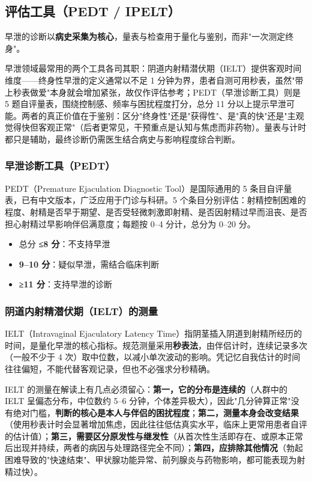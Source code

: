 \documentclass[12pt,a4paper,twoside]{ctexbook}
\begin{document}
\subsection{评估工具（PEDT / IPELT）}

早泄的诊断以\textbf{病史采集为核心}，量表与检查用于量化与鉴别，而非"一次测定终身"。


早泄领域最常用的两个工具各司其职：阴道内射精潜伏期（IELT）提供客观时间维度——终身性早泄的定义通常以不足 1 分钟为界，患者自测可用秒表，虽然"带上秒表做爱"本身就会增加紧张，故仅作评估参考；PEDT（早泄诊断工具）则是 5 题自评量表，围绕控制感、频率与困扰程度打分，总分 11 分以上提示早泄可能。两者的真正价值在于鉴别：区分"终身性"还是"获得性"、是"真的快"还是"主观觉得快但客观正常"（后者更常见，干预重点是认知与焦虑而非药物）。量表与计时都只是辅助，最终诊断仍需医生结合病史与影响程度综合判断。

\subsubsection{早泄诊断工具（PEDT）}

PEDT（Premature Ejaculation Diagnostic Tool）是国际通用的 5 条目自评量表，已有中文版本，广泛应用于门诊与科研。5 个条目分别评估：射精控制困难的程度、射精是否早于期望、是否受轻微刺激即射精、是否因射精过早而沮丧、是否担心射精过早影响伴侣满意度；每题按 0--4 分计，总分为 0--20 分。

\begin{itemize}
	\item 总分 \textbf{≤8 分}：不支持早泄
	\item \textbf{9--10 分}：疑似早泄，需结合临床判断
	\item \textbf{≥11 分}：支持早泄的诊断
\end{itemize}

\subsubsection{阴道内射精潜伏期（IELT）的测量}

IELT（Intravaginal Ejaculatory Latency Time）指阴茎插入阴道到射精所经历的时间，是量化早泄的核心指标。规范测量采用\textbf{秒表法}，由伴侣计时，连续记录多次（一般不少于 4 次）取中位数，以减小单次波动的影响。凭记忆自我估计的时间往往偏短，不能代替客观记录，但也不必强求分秒精确。


IELT 的测量在解读上有几点必须留心：\textbf{第一，它的分布是连续的}（人群中的 IELT 呈偏态分布，中位数约 5--6 分钟，个体差异极大），因此"几分钟算正常"没有绝对门槛，\textbf{判断的核心是本人与伴侣的困扰程度}；\textbf{第二，测量本身会改变结果}（使用秒表计时会显著增加焦虑，因此往往低估真实水平，临床上更常用患者自评的估计值）；\textbf{第三，需要区分原发性与继发性}（从首次性生活即存在、或原本正常后出现并持续，两者的病因与处理路径完全不同）；\textbf{第四，应排除其他情况}（勃起困难导致的"快速结束"、甲状腺功能异常、前列腺炎与药物影响，都可能表现为射精过快）。
\end{document}
